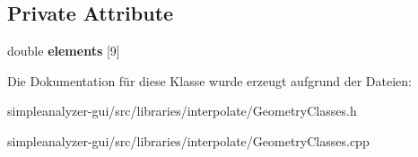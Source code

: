 \subsection*{Private Attribute}
\begin{DoxyCompactItemize}
\item 
\hypertarget{classMatrix3D_aa24b85b09060684ec1559f22857ccfee}{double {\bfseries elements} \mbox{[}9\mbox{]}}\label{classMatrix3D_aa24b85b09060684ec1559f22857ccfee}

\end{DoxyCompactItemize}


Die Dokumentation für diese Klasse wurde erzeugt aufgrund der Dateien\-:\begin{DoxyCompactItemize}
\item 
simpleanalyzer-\/gui/src/libraries/interpolate/Geometry\-Classes.\-h\item 
simpleanalyzer-\/gui/src/libraries/interpolate/Geometry\-Classes.\-cpp\end{DoxyCompactItemize}
